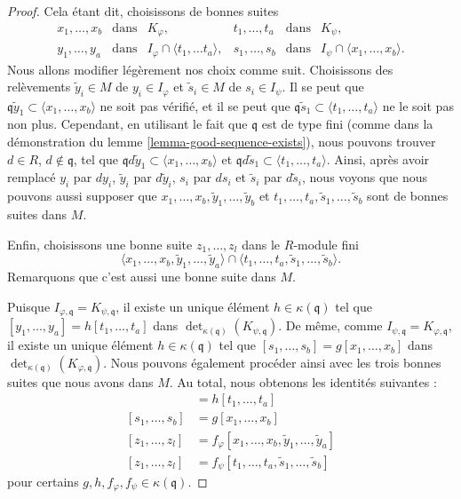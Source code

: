 \begin{proof}
\medskip\noindent
Cela étant dit, choisissons de bonnes suites
$$
\begin{matrix}
x_1, \ldots, x_b & \text{dans} & K_\varphi, &
t_1, \ldots, t_a & \text{dans} & K_\psi, \\
y_1, \ldots, y_a & \text{dans} & I_\varphi \cap \langle t_1, \ldots t_a\rangle, &
s_1, \ldots, s_b & \text{dans} & I_\psi \cap \langle x_1, \ldots, x_b\rangle.
\end{matrix}
$$
Nous allons modifier légèrement nos choix comme suit.
Choisissons des relèvements $\tilde y_i \in M$ de $y_i \in I_\varphi$
et $\tilde s_i \in M$ de $s_i \in I_\psi$. Il se peut
que $\mathfrak q \tilde y_1 \subset \langle x_1, \ldots, x_b\rangle$ ne soit pas vérifié,
et il se peut que
$\mathfrak q \tilde s_1 \subset \langle t_1, \ldots, t_a\rangle$ ne le soit pas non plus.
Cependant, en utilisant le fait que $\mathfrak q$ est de type fini (comme dans la démonstration
du lemme \ref{lemma-good-sequence-exists}), nous pouvons trouver
$d \in R$, $d \not \in \mathfrak q$, tel que
$\mathfrak q d\tilde y_1 \subset \langle x_1, \ldots, x_b\rangle$
et
$\mathfrak q d\tilde s_1 \subset \langle t_1, \ldots, t_a\rangle$.
Ainsi, après avoir remplacé $y_i$ par $dy_i$,
$\tilde y_i$ par $d\tilde y_i$, $s_i$ par $ds_i$ et $\tilde s_i$
par $d\tilde s_i$, nous voyons que nous pouvons aussi supposer que
$x_1, \ldots, x_b, \tilde y_1, \ldots, \tilde y_b$
et $t_1, \ldots, t_a, \tilde s_1, \ldots, \tilde s_b$
sont de bonnes suites dans $M$.

\medskip\noindent
Enfin, choisissons une bonne suite
$z_1, \ldots, z_l$ dans le $R$-module fini
$$
\langle
x_1, \ldots, x_b, \tilde y_1, \ldots, \tilde y_a
\rangle
\cap
\langle
t_1, \ldots, t_a, \tilde s_1, \ldots, \tilde s_b
\rangle.
$$
Remarquons que c'est aussi une bonne suite dans $M$.

\medskip\noindent
Puisque $I_{\varphi, \mathfrak q} = K_{\psi, \mathfrak q}$,
il existe un unique élément $h \in \kappa(\mathfrak q)$ tel que
$[y_1, \ldots, y_a] = h [t_1, \ldots, t_a]$
dans $\det_{\kappa(\mathfrak q)}(K_{\psi, \mathfrak q})$.
De même, comme $I_{\psi, \mathfrak q} = K_{\varphi, \mathfrak q}$,
il existe un unique élément $h \in \kappa(\mathfrak q)$ tel que
$[s_1, \ldots, s_b] = g [x_1, \ldots, x_b]$
dans $\det_{\kappa(\mathfrak q)}(K_{\varphi, \mathfrak q})$.
Nous pouvons également procéder ainsi avec les trois bonnes suites que nous avons
dans $M$. Au total, nous obtenons les identités suivantes :
\begin{align*}
[y_1, \ldots, y_a]
& =
h [t_1, \ldots, t_a] \\
[s_1, \ldots, s_b]
& =
g [x_1, \ldots, x_b] \\
[z_1, \ldots, z_l]
& =
f_\varphi [x_1, \ldots, x_b, \tilde y_1, \ldots, \tilde y_a] \\
[z_1, \ldots, z_l]
& =
f_\psi [t_1, \ldots, t_a, \tilde s_1, \ldots, \tilde s_b]
\end{align*}
pour certains $g, h, f_\varphi, f_\psi \in \kappa(\mathfrak q)$.


\end{proof}
